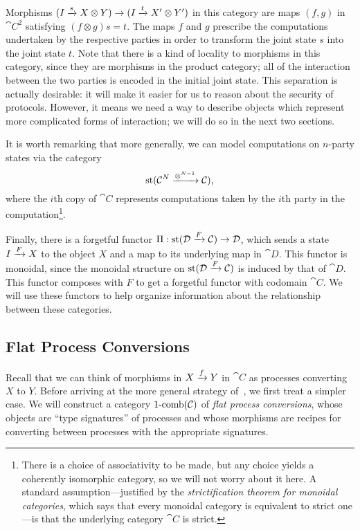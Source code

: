 Morphisms $(I\xrightarrow{s} X\otimes Y)\to(I\xrightarrow{t}X'\otimes Y')$ in this category are
maps $(f,g)$ in $\cat{C}^2$ satisfying $(f\otimes g)s = t$. The maps $f$ and $g$
prescribe the computations undertaken by the respective parties in order to
transform the joint state $s$ into the joint state $t$. Note that there is a
kind of locality to morphisms in this category, since they are morphisms in the
product category; all of the interaction between the two parties is encoded in
the initial joint state. This separation is actually desirable: it will make it
easier for us to reason about the security of protocols. However, it means we
need a way to describe objects which represent more complicated forms of
interaction; we will do so in the next two sections.

It is worth remarking that more generally, we can model computations on
$n$-party states via the category
\[
  \operatorname*{st}({\mathcal{C}}^N\xrightarrow{\otimes^{N-1}}{\mathcal{C}}),
\] where the $i$th copy of $\cat{C}$ represents computations taken by the $i$th
party in the computation\footnote{There is a choice of associativity to be made, but any
choice yields a coherently isomorphic category, so we will not worry about it
here. A standard assumption---justified by the \emph{strictification theorem for
monoidal categories}, which says that every monoidal category is equivalent to
strict one---is that the underlying category $\cat{C}$ is strict.}.

Finally, there is a forgetful functor $\Pi: \operatorname*{st}({\mathcal{D}}\xrightarrow{F}{\mathcal{C}})\to
{\mathcal{D}}$, which sends a state $I\xrightarrow{F}X$ to the object $X$ and a map to its
underlying map in $\cat{D}$. This functor is monoidal, since the monoidal
structure on $\operatorname*{st}({\mathcal{D}}\xrightarrow{F}{\mathcal{C}})$ is induced by that of $\cat{D}$.
This functor composes with $F$ to get a forgetful functor with codomain
$\cat{C}$. We will use these functors to help organize information about the
relationship between these categories.

\subsection{Flat Process Conversions}

Recall that we can think of morphisms in $X\xrightarrow{f} Y$ in $\cat{C}$ as processes
converting $X$ to $Y$. Before arriving at the more general strategy
of~\cite{broadbent-karvonen-2022}, we first treat a simpler case. We will
construct a category $\operatorname*{1-comb}({\mathcal{C}})$ of \emph{flat process conversions}, whose
objects are ``type signatures'' of processes and whose morphisms are recipes for
converting between processes with the appropriate signatures.

